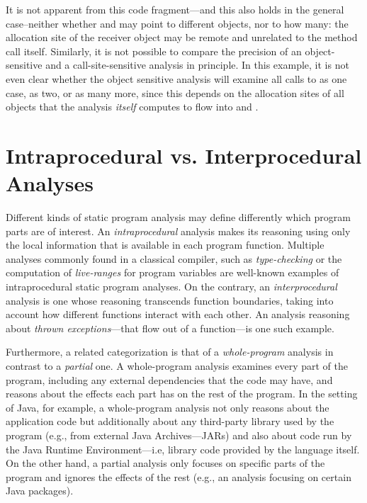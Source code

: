 It is not apparent from this code fragment---and this also holds in the general case--neither whether  and  may point to different objects, nor to how many: the allocation site of the receiver object may be remote and unrelated to the method call itself. Similarly, it is not possible to compare the precision of an object-sensitive and a call-site-sensitive analysis in principle. In this example, it is not even clear whether the object sensitive analysis will examine all calls to  as one case, as two, or as many more, since this depends on the allocation sites of all objects that the analysis \emph{itself} computes to flow into  and .


\section{Intraprocedural vs. Interprocedural Analyses}

Different kinds of static program analysis may define differently which program parts are of interest. An \emph{intraprocedural} analysis makes its reasoning using only the local information that is available in each program function. Multiple analyses commonly found in a classical compiler, such as \emph{type-checking} or the computation of \emph{live-ranges} for program variables are well-known examples of intraprocedural static program analyses. On the contrary, an \emph{interprocedural} analysis is one whose reasoning transcends function boundaries, taking into account how different functions interact with each other. An analysis reasoning about \emph{thrown exceptions}---that flow out of a function---is one such example.

Furthermore, a related categorization is that of a \emph{whole-program} analysis in contrast to a \emph{partial} one. A whole-program analysis examines every part of the program, including any external dependencies that the code may have, and reasons about the effects each part has on the rest of the program. In the setting of Java, for example, a whole-program analysis not only reasons about the application code but additionally about any third-party library used by the program (e.g., from external Java Archives---JARs) and also about code run by the Java Runtime Environment---i.e, library code provided by the language itself. On the other hand, a partial analysis only focuses on specific parts of the program and ignores the effects of the rest (e.g., an analysis focusing on certain Java packages).

